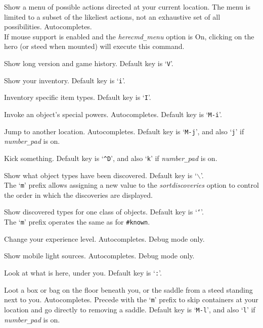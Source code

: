 Show a menu of possible actions directed at your current location.
The menu is limited to a subset of the likeliest actions, not an
exhaustive set of all possibilities.
Autocompletes.\\
If mouse support is enabled and the {\it herecmd\verb+_+menu\/}
option is On, clicking on the hero (or steed when mounted) will
execute this command.
\item[\tb{\#history}]
Show long version and game history. Default key is `{\tt V}'.
\item[\tb{\#inventory}]
Show your inventory. Default key is `{\tt i}'.
\item[\tb{\#inventtype}]
Inventory specific item types. Default key is `{\tt I}'.
\item[\tb{\#invoke}]
Invoke an object's special powers. Autocompletes. Default key is `{\tt M-i}'.
\item[\tb{\#jump}]
Jump to another location. Autocompletes.
Default key is `{\tt M-j}',
and also `{\tt j}' if {\it number\verb+_+pad\/} is on.
\item[\tb{\#kick}]
Kick something.
Default key is `{\tt \^{}D}',
and also `{\tt k}' if {\it number\verb+_+pad\/} is on.
\item[\tb{\#known}]
Show what object types have been discovered.
Default key is `{\tt $\backslash$}'.
\\
The `{\tt m}' prefix allows assigning a new value to the
{\it sortdiscoveries\/}
option to control the order in which the discoveries are displayed.
\item[\tb{\#knownclass}]
Show discovered types for one class of objects.
Default key is `{\tt `}'.
\\
The `{\tt m}' prefix operates the same as for {\tt \#known}.
\item[\tb{\#levelchange}]
Change your experience level.
Autocompletes.
Debug mode only.
\item[\tb{\#lightsources}]
Show mobile light sources.
Autocompletes.
Debug mode only.
\item[\tb{\#look}]
Look at what is here, under you. Default key is `{\tt :}'.
\item[\tb{\#loot}]
Loot a box or bag on the floor beneath you, or the saddle
from a steed standing next to you. Autocompletes.
Precede with the `{\tt m}' prefix to skip containers at your location
and go directly to removing a saddle.
Default key is `{\tt M-l}',
and also `{\tt l}' if {\it number\verb+_+pad\/} is on.
